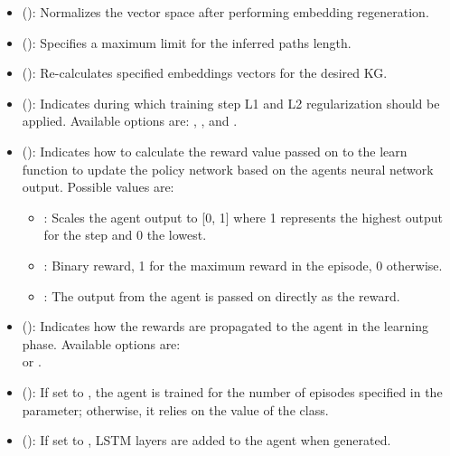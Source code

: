 \begin{itemize}
\item {} (): Normalizes the vector space after performing embedding regeneration.
\item {} (): Specifies  a maximum limit for the inferred paths length.

\item {} (): Re-calculates specified embeddings vectors for the desired KG.

\item {} (): Indicates during which training step L1 and L2 regularization should be applied. Available options are: , , and .

\item {} (): Indicates how to calculate the reward value passed on to the learn function to update the policy network based on the agents neural network output. Possible values are:
    \begin{itemize}
        \item {}: Scales the agent output to [0, 1] where 1 represents the highest output for the step and 0 the lowest.
        \item {}: Binary reward, 1 for the maximum reward in the episode, 0 otherwise.
        \item {}: The output from the agent is passed on directly as the reward.
    \end{itemize}
\item {} (): Indicates how the rewards are propagated to the agent in the learning phase. Available options are: 
 \\ or .

\item {} (): If set to , the agent is trained for the number of episodes specified in the  parameter; otherwise, it relies on the  value of the  class.

\item {} (): If set to , LSTM layers are added to the agent when generated.

\end{itemize}

